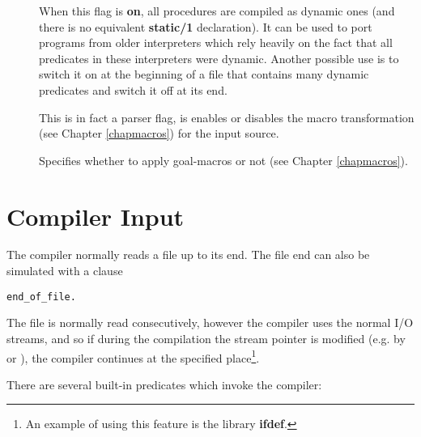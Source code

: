 \begin{description}
\item [] 
When this flag is {\bf on}, all procedures are compiled
as dynamic ones (and there is no equivalent {\bf static/1}
declaration).
It can be used to port programs from older interpreters
which rely heavily on the fact that all predicates
in these interpreters were dynamic.
Another possible use is to switch it on at the beginning of a file
that contains many dynamic predicates and switch it off at its end.

\item [] 
This is in fact a parser flag, is enables or disables the macro transformation
(see Chapter \ref{chapmacros}) for the input source.

\item [] 
Specifies whether to apply goal-macros or not (see Chapter \ref{chapmacros}).
\end{description}

\section{Compiler Input}
The compiler normally reads a file up to its end.
The file end can also be simulated with a clause
\begin{verbatim}
end_of_file.
\end{verbatim}
The file is normally read consecutively, however
the compiler uses the normal {\eclipse} I/O streams,
and so if during the compilation the stream pointer is modified
(e.g. by  or ), the compiler continues
at the specified place\footnote{An example of using this feature
is the library {\bf ifdef}.}.

There are several built-in predicates which invoke the compiler:

